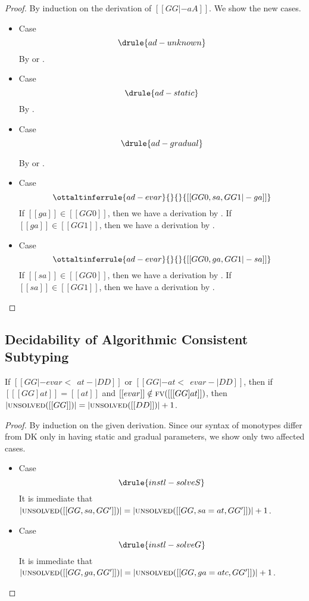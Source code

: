 \decInstan*
\begin{proof}
  By induction on the derivation of $[[  GG |- aA   ]]$. We show the new cases.
  \begin{itemize}
  \item Case \[  \drule{ad-unknown}   \]
    By  or .

  \item Case \[  \drule{ad-static}   \]
    By .

  \item Case \[  \drule{ad-gradual}   \]

    By  or .


  \item Case \[    \ottaltinferrule{ad-evar}{}{  }{ [[  GG0, sa, GG1 |- ga  ]] }  \]
    If $[[ga]] \in [[GG0]]  $, then we have a derivation by . If $[[ga]] \in [[GG1]]$, then
    we have a derivation by .


  \item Case \[    \ottaltinferrule{ad-evar}{}{  }{ [[  GG0, ga, GG1 |- sa  ]] }  \]
    If $[[sa]] \in [[GG0]]  $, then we have a derivation by . If $[[sa]] \in [[GG1]]$, then
    we have a derivation by .

  \end{itemize}


\end{proof}



\subsection{Decidability of Algorithmic Consistent Subtyping}


\begin{lemma} \label{lemma:mono_solve_var}
  If $[[ GG |- evar <~~ at -| DD ]]$ or $[[ GG |- at <~~ evar -| DD  ]]$, then if $[[  [GG]at   ]] = [[at]]$ and
  $[[evar]] \notin \textsc{fv}([[ [GG] at  ]])$, then $| \textsc{unsolved}([[GG]])   | = |  \textsc{unsolved}([[DD]])      | + 1$.
\end{lemma}
\begin{proof}
  By induction on the given derivation. Since our syntax of monotypes differ
  from DK only in having static and gradual parameters, we show only two affected cases.
  \begin{itemize}
  \item Case \[  \drule{instl-solveS}  \]
    It is immediate that $|  \textsc{unsolved}([[GG, sa, GG']])    | = |  \textsc{unsolved}([[GG, sa = at, GG']])    | + 1$.
  \item Case \[  \drule{instl-solveG}  \]
    It is immediate that $|  \textsc{unsolved}([[GG, ga, GG']])    | = |  \textsc{unsolved}([[GG, ga = atc, GG']])    | + 1$.
  \end{itemize}
\end{proof}


